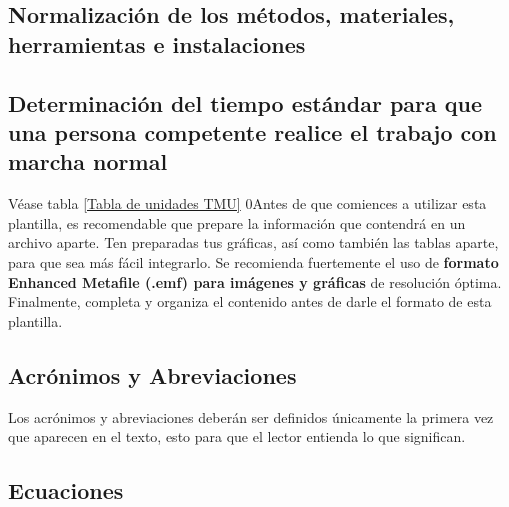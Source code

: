     \subsection{Normalización de los métodos, materiales, herramientas e instalaciones}
    
    \subsection{Determinación del tiempo estándar para que una persona competente realice el trabajo con marcha normal}
    Véase tabla \ref{Tabla de unidades TMU}
    0Antes de que comiences a utilizar esta plantilla, es recomendable que prepare la información que contendrá en un archivo aparte. 
    Ten preparadas tus gráficas, así como también las tablas aparte, para que sea más fácil integrarlo. 
    Se recomienda fuertemente el uso de \textbf{formato Enhanced Metafile (.emf) para imágenes y gráficas} de resolución óptima. 
    Finalmente, completa y organiza el contenido antes de darle el formato de esta plantilla. 
    
    \subsection{Acrónimos y Abreviaciones}
    
    Los acrónimos y abreviaciones deberán ser definidos únicamente la primera vez que aparecen en el texto, esto para que el lector entienda lo que significan.
    
    \subsection{Ecuaciones}
    
    
    
